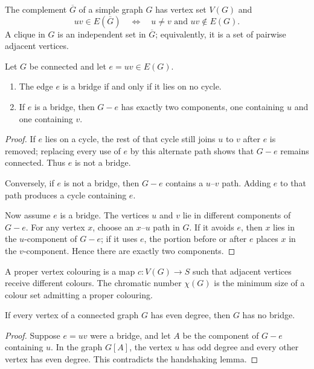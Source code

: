\begin{notedefinition}
The complement $\overline G$ of a simple graph $G$ has vertex set $V(G)$ and
\[
  uv\in E(\overline G)
  \quad\Longleftrightarrow\quad
  u\ne v\text{ and }uv\notin E(G).
\]
A clique in $G$ is an independent set in $\overline G$; equivalently, it is a set of pairwise adjacent vertices.
\end{notedefinition}
\begin{notetheorem}
Let $G$ be connected and let $e=uv\in E(G)$.
\begin{enumerate}
  \item The edge $e$ is a bridge if and only if it lies on no cycle.
  \item If $e$ is a bridge, then $G-e$ has exactly two components, one containing $u$ and one containing $v$.
\end{enumerate}
\end{notetheorem}
\begin{proof}
If $e$ lies on a cycle, the rest of that cycle still joins $u$ to $v$ after $e$ is removed; replacing every use of $e$ by this alternate path shows that $G-e$ remains connected.  Thus $e$ is not a bridge.

Conversely, if $e$ is not a bridge, then $G-e$ contains a $u$--$v$ path.  Adding $e$ to that path produces a cycle containing $e$.

Now assume $e$ is a bridge.  The vertices $u$ and $v$ lie in different components of $G-e$.  For any vertex $x$, choose an $x$--$u$ path in $G$.  If it avoids $e$, then $x$ lies in the $u$-component of $G-e$; if it uses $e$, the portion before or after $e$ places $x$ in the $v$-component.  Hence there are exactly two components.
\end{proof}
\begin{notedefinition}
A proper vertex colouring is a map $c:V(G)\to S$ such that adjacent vertices receive different colours.  The chromatic number $\chi(G)$ is the minimum size of a colour set admitting a proper colouring.
\end{notedefinition}

\begin{notetheorem}
If every vertex of a connected graph $G$ has even degree, then $G$ has no bridge.
\end{notetheorem}
\begin{proof}
Suppose $e=uv$ were a bridge, and let $A$ be the component of $G-e$ containing $u$.  In the graph $G[A]$, the vertex $u$ has odd degree and every other vertex has even degree.  This contradicts the handshaking lemma.
\end{proof}

